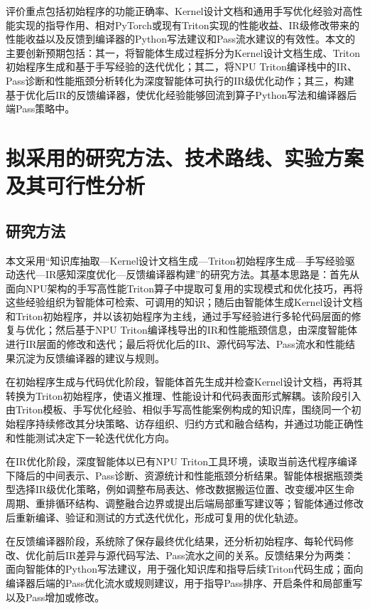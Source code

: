 评价重点包括初始程序的功能正确率、Kernel设计文档和通用手写优化经验对高性能实现的指导作用、相对PyTorch或现有Triton实现的性能收益、IR级修改带来的性能收益以及反馈到编译器的Python写法建议和Pass流水建议的有效性。本文的主要创新预期包括：其一，将智能体生成过程拆分为Kernel设计文档生成、Triton初始程序生成和基于手写经验的迭代优化；其二，将NPU Triton编译栈中的IR、Pass诊断和性能瓶颈分析转化为深度智能体可执行的IR级优化动作；其三，构建基于优化后IR的反馈编译器，使优化经验能够回流到算子Python写法和编译器后端Pass策略中。

\chapter{拟采用的研究方法、技术路线、实验方案及其可行性分析}

\section{研究方法}

本文采用“知识库抽取—Kernel设计文档生成—Triton初始程序生成—手写经验驱动迭代—IR感知深度优化—反馈编译器构建”的研究方法。其基本思路是：首先从面向NPU架构的手写高性能Triton算子中提取可复用的实现模式和优化技巧，再将这些经验组织为智能体可检索、可调用的知识；随后由智能体生成Kernel设计文档和Triton初始程序，并以该初始程序为主线，通过手写经验进行多轮代码层面的修复与优化；然后基于NPU Triton编译栈导出的IR和性能瓶颈信息，由深度智能体进行IR层面的修改和迭代；最后将优化后的IR、源代码写法、Pass流水和性能结果沉淀为反馈编译器的建议与规则。

在初始程序生成与代码优化阶段，智能体首先生成并检查Kernel设计文档，再将其转换为Triton初始程序，使语义推理、性能设计和代码表面形式解耦。该阶段引入由Triton模板、手写优化经验、相似手写高性能案例构成的知识库，围绕同一个初始程序持续修改其分块策略、访存组织、归约方式和融合结构，并通过功能正确性和性能测试决定下一轮迭代优化方向。

在IR优化阶段，深度智能体以已有NPU Triton工具环境，读取当前迭代程序编译下降后的中间表示、Pass诊断、资源统计和性能瓶颈分析结果。智能体根据瓶颈类型选择IR级优化策略，例如调整布局表达、修改数据搬运位置、改变缓冲区生命周期、重排循环结构、调整融合边界或提出后端局部重写建议等；智能体通过修改后重新编译、验证和测试的方式迭代优化，形成可复用的优化轨迹。

在反馈编译器阶段，系统除了保存最终优化结果，还分析初始程序、每轮代码修改、优化前后IR差异与源代码写法、Pass流水之间的关系。反馈结果分为两类：面向智能体的Python写法建议，用于强化知识库和指导后续Triton代码生成；面向编译器后端的Pass优化流水或规则建议，用于指导Pass排序、开启条件和局部重写以及Pass增加或修改。

